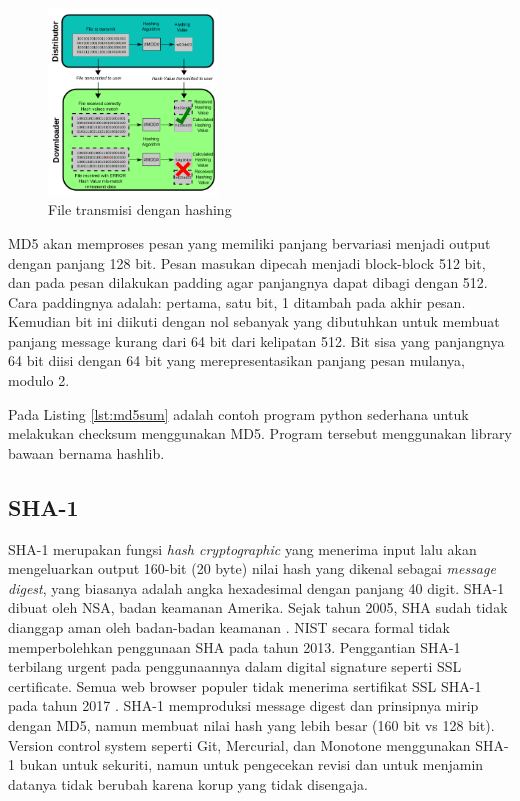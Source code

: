 \begin{figure} [ht]
  \centering
  \includegraphics[width=0.4\textwidth]{gambar/hashing-file-transmission.png}

  \caption{File transmisi dengan hashing}
  \label{fig:hashingfiletransmission}
\end{figure}

MD5 akan memproses pesan yang memiliki panjang bervariasi menjadi output dengan panjang 128 bit. Pesan masukan dipecah menjadi block-block 512 bit, dan pada pesan dilakukan padding agar panjangnya dapat dibagi dengan 512. Cara paddingnya adalah: pertama, satu bit, 1 ditambah pada akhir pesan. Kemudian bit ini diikuti dengan nol sebanyak yang dibutuhkan untuk membuat panjang message kurang dari 64 bit dari kelipatan 512. Bit sisa yang panjangnya 64 bit diisi dengan 64 bit yang merepresentasikan panjang pesan mulanya, modulo 2.



Pada Listing \ref{lst:md5sum} adalah contoh program python sederhana untuk melakukan checksum menggunakan MD5. Program tersebut menggunakan library bawaan bernama hashlib.

\subsection{SHA-1}
\label{subsec:SHA1}

SHA-1 merupakan fungsi \emph{hash cryptographic} yang menerima input lalu akan mengeluarkan output 160-bit (20 byte) nilai hash yang dikenal sebagai \emph{message digest}, yang biasanya adalah angka hexadesimal dengan panjang 40 digit. SHA-1 dibuat oleh NSA, badan keamanan Amerika. Sejak tahun 2005, SHA sudah tidak dianggap aman oleh badan-badan keamanan \citep{schneier2005}. NIST secara formal tidak memperbolehkan penggunaan SHA pada tahun 2013. Penggantian SHA-1 terbilang urgent pada penggunaannya dalam digital signature seperti SSL certificate. Semua web browser populer tidak menerima sertifikat SSL SHA-1 pada tahun 2017 \citep{mozilla2019,google2015}. SHA-1 memproduksi message digest dan prinsipnya mirip dengan MD5, namun membuat nilai hash yang lebih besar (160 bit vs 128 bit). Version control system seperti Git, Mercurial, dan Monotone menggunakan SHA-1 bukan untuk sekuriti, namun untuk pengecekan revisi dan untuk menjamin datanya tidak berubah karena korup yang tidak disengaja.

